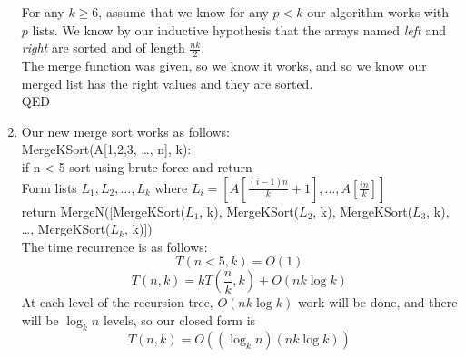 \documentclass[11pt]{article}
\begin{document}
\begin{solution}
\begin{enumerate}
            For any $k \geq 6$, assume that we know for any $p < k$ our algorithm works with $p$ lists. We know by our inductive hypothesis that the arrays named \textit{left} and \textit{right} are sorted and of length $\frac{nk}{2}$. \\
            The merge function was given, so we know it works, and so we know our merged list has the right values and they are sorted. \\
            QED
        \item Our new merge sort works as follows: \\
            MergeKSort(A[1,2,3, \ldots, n], k): \\
            if n < 5 sort using brute force and return \\
            Form lists $L_1, L_2, \ldots, L_k$ where $L_i = [A[\frac{(i - 1)n}{k} + 1],\ldots,A[\frac{in}{k}]]$ \\
            return MergeN([MergeKSort($L_1$, k), MergeKSort($L_2$, k), MergeKSort($L_3$, k), \ldots, MergeKSort($L_k$, k)]) \\ 
            The time recurrence is as follows: 
            \[
                T(n < 5, k) = O(1)
            \]
            \[
                T(n, k) = kT(\frac{n}{k}, k) + O(nk \log k)
            \]
            At each level of the recursion tree, $O(nk\log k)$ work will be done, and there will be $\log_kn$ levels, so our closed form is 
            \[
                T(n, k) = O((\log_kn)(nk \log k))
            \]

    \end{enumerate}
\end{solution}

\end{document}
